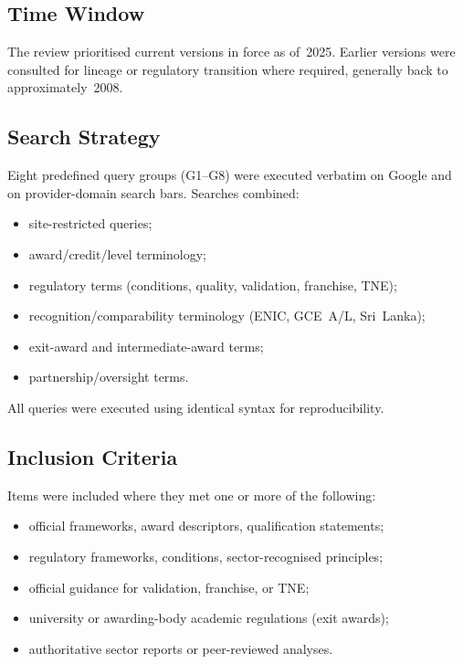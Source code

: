 \subsection{Time Window}

The review prioritised current versions in force as of~2025. Earlier versions
were consulted for lineage or regulatory transition where required, generally
back to approximately~2008.

\subsection{Search Strategy}

Eight predefined query groups (G1--G8) were executed verbatim on Google and on
provider-domain search bars. Searches combined:

\begin{itemize}
    \item site-restricted queries;
    \item award/credit/level terminology;
    \item regulatory terms (conditions, quality, validation, franchise, TNE);
    \item recognition/comparability terminology (ENIC, GCE~A/L, Sri~Lanka);
    \item exit-award and intermediate-award terms;
    \item partnership/oversight terms.
\end{itemize}

All queries were executed using identical syntax for reproducibility.

\subsection{Inclusion Criteria}

Items were included where they met one or more of the following:

\begin{itemize}
    \item official frameworks, award descriptors, qualification statements;
    \item regulatory frameworks, conditions, sector-recognised principles;
    \item official guidance for validation, franchise, or TNE;
    \item university or awarding-body academic regulations (exit awards);
    \item authoritative sector reports or peer-reviewed analyses.
\end{itemize}

